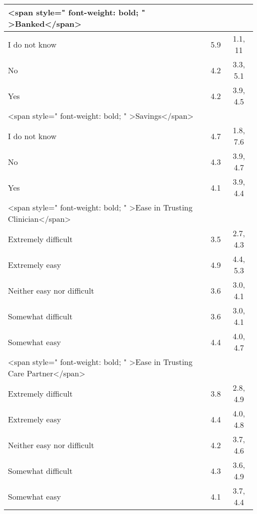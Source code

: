 \documentclass[border=1mm]{standalone}
\begin{document}
\begin{tabular}{l|c|c}
\hline
<span style=" font-weight: bold;    " >Banked</span> &  & \\
\hline
\hspace{1em}I do not know & 5.9 & 1.1, 11\\
\hline
\hspace{1em}No & 4.2 & 3.3, 5.1\\
\hline
\hspace{1em}Yes & 4.2 & 3.9, 4.5\\
\hline
<span style=" font-weight: bold;    " >Savings</span> &  & \\
\hline
\hspace{1em}I do not know & 4.7 & 1.8, 7.6\\
\hline
\hspace{1em}No & 4.3 & 3.9, 4.7\\
\hline
\hspace{1em}Yes & 4.1 & 3.9, 4.4\\
\hline
<span style=" font-weight: bold;    " >Ease in Trusting Clinician</span> &  & \\
\hline
\hspace{1em}Extremely difficult & 3.5 & 2.7, 4.3\\
\hline
\hspace{1em}Extremely easy & 4.9 & 4.4, 5.3\\
\hline
\hspace{1em}Neither easy nor difficult & 3.6 & 3.0, 4.1\\
\hline
\hspace{1em}Somewhat difficult & 3.6 & 3.0, 4.1\\
\hline
\hspace{1em}Somewhat easy & 4.4 & 4.0, 4.7\\
\hline
<span style=" font-weight: bold;    " >Ease in Trusting Care Partner</span> &  & \\
\hline
\hspace{1em}Extremely difficult & 3.8 & 2.8, 4.9\\
\hline
\hspace{1em}Extremely easy & 4.4 & 4.0, 4.8\\
\hline
\hspace{1em}Neither easy nor difficult & 4.2 & 3.7, 4.6\\
\hline
\hspace{1em}Somewhat difficult & 4.3 & 3.6, 4.9\\
\hline
\hspace{1em}Somewhat easy & 4.1 & 3.7, 4.4\\
\hline

\end{tabular}
\end{document}
